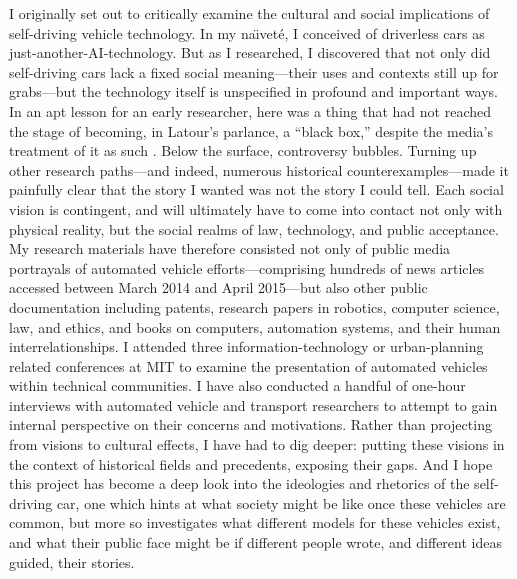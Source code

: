 

I originally set out to critically examine the cultural and social
implications of self-driving vehicle technology. In my na\"{\i}vet\'{e}, I
conceived of driverless cars as just-another-AI-technology. But as I
researched, I discovered that not only did 
self-driving cars lack a fixed social meaning---their uses and
contexts still up for grabs---but the technology itself is unspecified
in profound and important ways. In an apt lesson for an early researcher,
here was a thing that had not reached the stage of becoming, in
Latour's parlance, a ``black box,'' despite the media's treatment of
it as such \cite{LatourScience}. Below the surface, controversy
bubbles. Turning up other research paths---and indeed, numerous historical
counterexamples---made it painfully clear that the story I wanted was
not the story I could tell. Each social vision is
contingent, and will ultimately have to come into
contact not only with physical reality, but the social realms of law,
technology, and public acceptance. My research materials have
therefore consisted not only of public media portrayals of automated
vehicle efforts---comprising hundreds of news articles accessed
between March 2014 and April 2015---but also other public
documentation including patents, research papers in robotics,
computer science, law, and ethics, and books on computers, automation systems,
and their human 
interrelationships. I attended three information-technology or urban-planning
related conferences at MIT to examine the presentation of automated
vehicles within technical communities. I have also conducted a handful
of one-hour interviews with 
automated vehicle and transport researchers to attempt to gain
internal perspective on their concerns and motivations. Rather than
projecting from visions to cultural effects, I have had to dig deeper:
putting these visions in the context of 
historical fields and precedents, exposing their gaps. And I hope this project has become a  
deep look into the ideologies and rhetorics of the self-driving car,
one which hints at what society might be like once these
vehicles are common, but more so investigates what different models for these vehicles
exist, and what their public face might be if different people wrote,
and different ideas guided, their stories.

